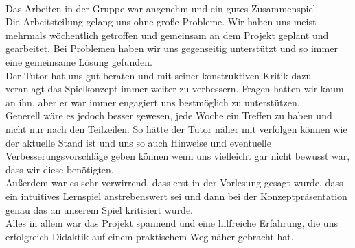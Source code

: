 \documentclass[10pt,a4paper,notitlepage]{report}
\begin{document}
	\\\par\medskip\Text
	Das Arbeiten in der Gruppe war angenehm und ein gutes Zusammenspiel.\\
	Die Arbeitsteilung gelang uns ohne große Probleme. Wir haben uns meist mehrmals wöchentlich getroffen und gemeinsam an dem Projekt geplant und gearbeitet. Bei Problemen haben wir uns gegenseitig unterstützt und so immer eine gemeinsame Lösung gefunden.\\
	Der Tutor hat uns gut beraten und mit seiner konstruktiven Kritik dazu veranlagt das Spielkonzept immer weiter zu verbessern. Fragen hatten wir kaum an ihn, aber er war immer engagiert uns bestmöglich zu unterstützen.\\
	Generell wäre es jedoch besser gewesen, jede Woche ein Treffen zu haben und nicht nur nach den Teilzeilen. So hätte der Tutor näher mit verfolgen können wie der aktuelle Stand ist und uns so auch Hinweise und eventuelle Verbesserungsvorschläge geben können wenn uns vielleicht gar nicht bewusst war, dass wir diese benötigten.\\
	Außerdem war es sehr verwirrend, dass erst in der Vorlesung gesagt wurde, dass ein intuitives Lernspiel anstrebenswert sei und dann bei der Konzeptpräsentation genau das an unserem Spiel kritisiert wurde.\\
	Alles in allem war das Projekt spannend und eine hilfreiche Erfahrung, die uns erfolgreich Didaktik auf einem praktischem Weg näher gebracht hat.\\\par\smallskip
\end{document}
